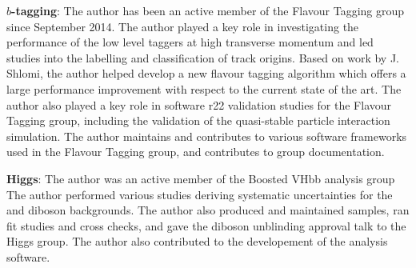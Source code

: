 \textbf{$b$-tagging}:
The author has been an active member of the Flavour Tagging group since September 2014. 
The author played a key role in investigating the performance of the low level taggers at high transverse momentum and led studies into the labelling and classification of track origins.
Based on work by J. Shlomi, the author helped develop a new flavour tagging algorithm which offers a large performance improvement with respect to the current state of the art.
The author also played a key role in software r22 validation studies for the Flavour Tagging group, including the validation of the quasi-stable particle interaction simulation.
The author maintains and contributes to various software frameworks used in the Flavour Tagging group, and contributes to group documentation.

\textbf{Higgs}:
The author was an active member of the Boosted VHbb analysis group
The author performed various studies deriving systematic uncertainties for the \Vjets and diboson backgrounds.
The author also produced and maintained samples, ran fit studies and cross checks, and gave the diboson unblinding approval talk to the Higgs group.
The author also contributed to the developement of the analysis software.
